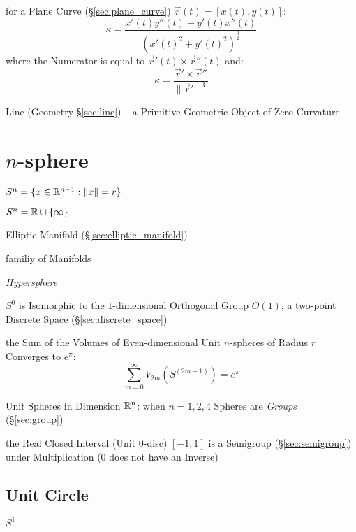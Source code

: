 for a Plane Curve (\S\ref{sec:plane_curve}) $\vec{r}(t) = [x(t),y(t)]$:
\[
  \kappa = \frac{x'(t)y''(t) - y'(t)x''(t)} {(x'(t)^2 + y'(t)^2)^{\frac{3}{2}}}
\]
where the Numerator is equal to $\vec{r}'(t) \times \vec{r}''(t)$ and:
\[
  \kappa = \frac{\vec{r}' \times \vec{r}''}{\|\vec{r}'\|^3}
\]

\fist Line (Geometry \S\ref{sec:line}) -- a Primitive Geometric Object of Zero
Curvature



\section{$n$-sphere}\label{sec:n_sphere}

$S^n = \{ x \in \mathbb{R}^{n+1} : \|x\| = r \}$

$S^n = \mathbb{R} \cup \{\infty\}$

Elliptic Manifold (\S\ref{sec:elliptic_manifold})

familiy of Manifolds

\emph{Hypersphere}

$S^0$ is Isomorphic to the $1$-dimensional Orthogonal Group $O(1)$, a
two-point Discrete Space (\S\ref{sec:discrete_space})

the Sum of the Volumes of Even-dimensional Unit $n$-spheres of Radius $r$
Converges to $e^\pi$:
\[
  \sum_{m=0}^\infty V_{2m}(S^{(2m-1)}) = e^\pi
\]

Unit Spheres in Dimension $\mathbb{R}^n$: when $n = 1, 2, 4$ Spheres are
\emph{Groups} (\S\ref{sec:group})



the Real Closed Interval (Unit 0-disc) $[-1,1]$ is a Semigroup
(\S\ref{sec:semigroup}) under Multiplication ($0$ does not have an Inverse)



\subsection{Unit Circle}\label{sec:unit_circle}

$S^1$



